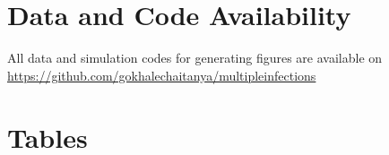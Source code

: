 \documentclass[11pt]{article}
\begin{document}
\section*{Data and Code Availability}
All data and simulation codes for generating figures are available on 
\url{https://github.com/gokhalechaitanya/multipleinfections}

\newpage{}

%
%




\newpage{}

\section*{Tables}
\renewcommand{\thetable}{\arabic{table}}
\setcounter{table}{0}
\end{document}
